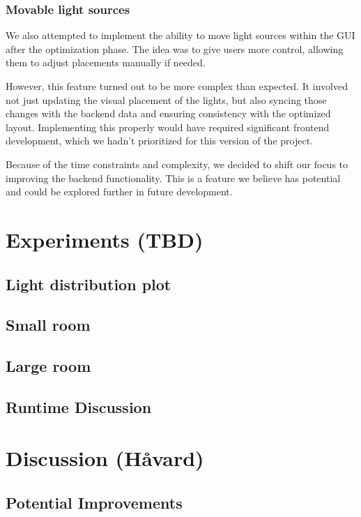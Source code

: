 \documentclass{article}
\begin{document}
\subsubsection{Movable light sources}
We also attempted to implement the ability to move light sources within the GUI after the optimization phase. The idea was to give users more control, allowing them to adjust placements manually if needed.

However, this feature turned out to be more complex than expected. It involved not just updating the visual placement of the lights, but also syncing those changes with the backend data and ensuring consistency with the optimized layout. Implementing this properly would have required significant frontend development, which we hadn’t prioritized for this version of the project.

Because of the time constraints and complexity, we decided to shift our focus to improving the backend functionality. This is a feature we believe has potential and could be explored further in future development.


\newpage

\section{Experiments (TBD)}
\subsection{Light distribution plot}
\subsection{Small room}
\subsection{Large room}
\subsection{Runtime Discussion}



\newpage

\section{Discussion (Håvard)}

\subsection{Potential Improvements}
\end{document}
